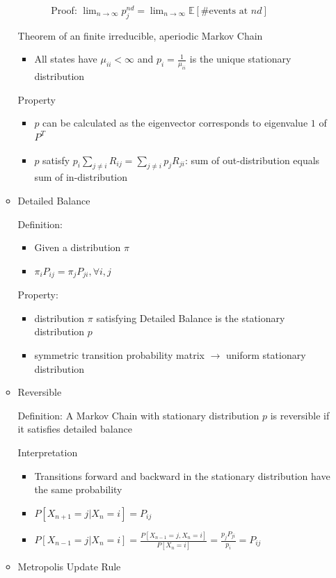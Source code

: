 \documentclass[a4paper]{article}
\begin{document}
\begin{itemize}
\begin{itemize}
\begin{itemize}
\begin{itemize}
                            Proof: $\lim_{n \rightarrow \infty} p_j^{nd} = \lim_{n \rightarrow \infty} \mathbb{E}[\text{\# events at $nd$}]$
                        \end{itemize}
                \end{itemize}
                Theorem of an finite irreducible, aperiodic Markov Chain
                \begin{itemize}
                    \item All states have $\mu_{ii} < \infty$ and $p_i = \frac{1}{\mu_{ii}}$ is the unique stationary distribution
                \end{itemize}
                Property
                \begin{itemize}
                    \item $p$ can be calculated as the eigenvector corresponds to eigenvalue $1$ of $P^T$
                    \item $p$ satisfy $p_i \sum_{j \not = i} R_{ij} = \sum_{j \not = i} p_j R_{ji}$: sum of out-distribution equals sum of in-distribution
                \end{itemize}
            \item Detailed Balance

                Definition:
                \begin{itemize}
                    \item Given a distribution $\pi$
                    \item $\pi_i P_{ij} = \pi_j P_{ji}, \forall i, j$
                \end{itemize}
                Property: 
                \begin{itemize}
                    \item distribution $\pi$ satisfying Detailed Balance is the stationary distribution $p$
                    \item symmetric transition probability matrix $\rightarrow$ uniform stationary distribution
                \end{itemize}
            \item Reversible

                Definition: A Markov Chain with stationary distribution $p$ is reversible if it satisfies detailed balance

                Interpretation
                \begin{itemize}
                    \item Transitions forward and backward in the stationary distribution have the same probability
                    \item $P[X_{n+1} = j| X_n = i] = P_{ij}$
                    \item $P[X_{n-1} = j| X_n = i] = \frac{P[X_{n-1} = j, X_n = i]}{P[X_n = i]} = \frac{p_j P_{ji}}{p_i} = P_{ij}$
                \end{itemize}
            \item Metropolis Update Rule


\end{itemize}
\end{itemize}
\end{document}
